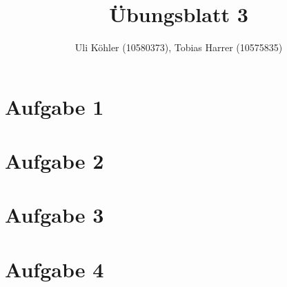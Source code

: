 \documentclass[a4paper,10pt,oneside,leqno]{scrartcl}
\title{Übungsblatt 3}
\author{Uli Köhler (10580373), Tobias Harrer (10575835)}
\begin{document}
\maketitle

\section*{Aufgabe 1}
\section*{Aufgabe 2}
\section*{Aufgabe 3}
\section*{Aufgabe 4}
\end{document}
